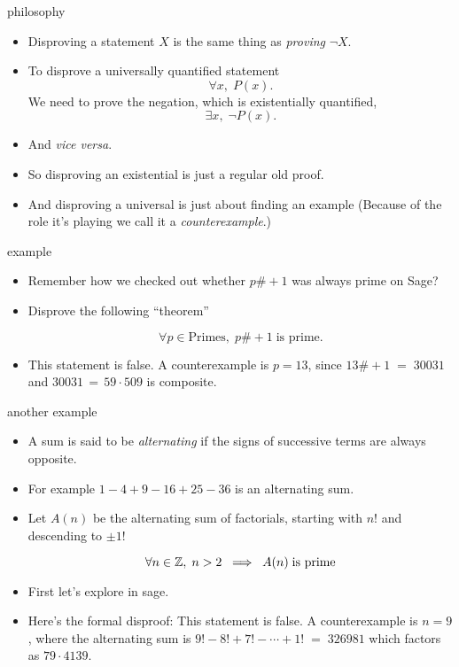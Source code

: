 \documentclass[landscape]{beamer}
\begin{document}
\begin{frame}{philosophy}
\begin{itemize}
\item Disproving a statement $X$ is the same thing as {\em proving} $\lnot X$.\pause
\item To disprove a universally quantified statement \pause 
\[ \forall x, \; P(x). \] \pause
We need to prove the negation, which is existentially quantified, \pause
\[ \exists x, \; \lnot P(x). \] \pause
\item And {\em vice versa}. \pause
\item So disproving an existential is just a regular old proof. \pause
\item And disproving a universal is just about finding an example \pause \newline
(Because of the role it's playing we call it a {\em counterexample}.)
\end{itemize}
\end{frame}

\begin{frame}{example}
\begin{itemize}
\item Remember how we checked out whether $p\# + 1$ was always prime on Sage? \pause
\item Disprove the following ``theorem''
\begin{thm*}
\[ \forall p \in \mbox{Primes}, \; p\# + 1 \; \mbox{is prime.} \]
\end{thm*}
\pause

\item This statement is false.  A counterexample is $p=13$, since $13\# + 1 \; = \; 30031$ and $30031 \, = \, 59\cdot 509$ is composite. 
\end{itemize}
\end{frame}

\begin{frame}{another example}
\begin{itemize}
\item A sum is said to be {\em alternating} if the signs of successive terms are always opposite. \pause
\item For example $1-4+9-16+25-36$ is an alternating sum. \pause
\item Let $A(n)$ be the alternating sum of factorials, starting with $n!$ and descending to $\pm 1!$\pause
\begin{thm*}
\[ \forall n \in {\mathbb Z}, \; n>2 \; \implies \; A(n) \; \mbox{is prime} \]
\end{thm*}
\pause
\item First let's explore in sage. \pause
\item Here's the formal disproof: \pause \newline
This statement is false.  A counterexample is $n=9$, where the alternating sum is $9!-8!+7!- \cdots +1! \; = \; 326981$ which factors as $79\cdot 4139$.
\end{itemize}
\end{frame}
\end{document}
